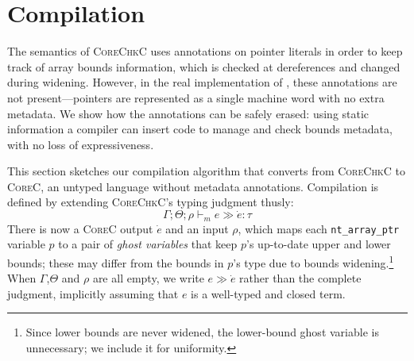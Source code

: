 \documentclass[conference]{IEEEtran}
\newcommand{\code}[1]{\lstinline|#1|}
\newcommand{\lang}{\textsc{CoreChkC}\xspace}
\newcommand{\elang}{\textsc{CoreC}\xspace}
\newcommand{\checkedc}{\text{Checked C}\xspace}
\begin{document}



 \section{Compilation}\label{sec:compilation}

The semantics of \lang uses annotations on pointer literals in
order to keep track of array bounds information, which is checked at
dereferences and changed during widening. However, in the real
implementation of \checkedc, these annotations
are not present---pointers are represented as a single
machine word with no extra metadata. We show how the
annotations can be safely erased: using static information a compiler
can insert code to manage and check bounds metadata, with no loss of
expressiveness. 

This section sketches our compilation algorithm that converts from
\lang to \elang, an untyped language without metadata annotations.
Compilation is defined by extending \lang's
typing judgment thusly:
\[\Gamma;\Theta;\rho \vdash_m e \gg \dot e:\tau\]
There is now a \elang output $\dot e$ and an input $\rho$, which maps
each \code{nt_array_ptr} variable $p$ to a pair of \emph{ghost
  variables} that keep $p$'s up-to-date upper and lower bounds; these
may differ from the bounds in $p$'s type due to bounds
widening.\footnote{Since lower bounds are never widened, the
  lower-bound ghost variable is unnecessary; we include it for uniformity.}
When $\Gamma$,$\Theta$ and $\rho$ are all empty, we write $e \gg \dot e$ rather than the
complete judgment, implicitly assuming that $e$ is a well-typed and closed
term.
\end{document}
